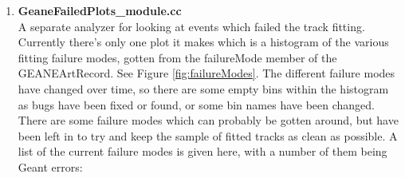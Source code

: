 \begin{enumerate}
      \item{\bf{GeaneFailedPlots\_module.cc}} \\
      A separate analyzer for looking at events which failed the track fitting. Currently there's only one plot it makes which is a histogram of the various fitting failure modes, gotten from the failureMode member of the GEANEArtRecord. See Figure \ref{fig:failureModes}. The different failure modes have changed over time, so there are some empty bins within the histogram as bugs have been fixed or found, or some bin names have been changed. There are some failure modes which can probably be gotten around, but have been left in to try and keep the sample of fitted tracks as clean as possible. A list of the current failure modes is given here, with a number of them being Geant errors:

        \begin{itemize}


\end{itemize}
\end{enumerate}
